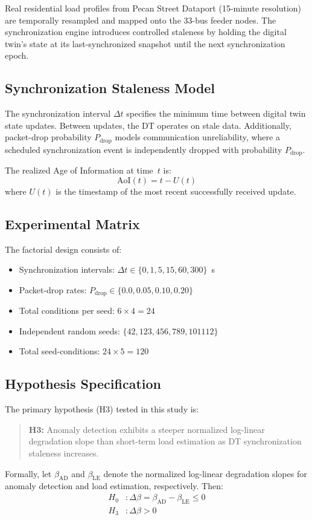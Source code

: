 \documentclass[journal]{IEEEtran}
\newcommand{\dtsync}{\Delta t}
\newcommand{\pdrop}{P_{\mathrm{drop}}}
\newcommand{\aoi}{\mathrm{AoI}}
\newcommand{\dbeta}{\Delta\beta}
\begin{document}
Real residential load profiles from Pecan Street Dataport (15-minute
resolution) are temporally resampled and mapped onto the 33-bus feeder nodes.
The synchronization engine introduces controlled staleness by holding the
digital twin's state at its last-synchronized snapshot until the next
synchronization epoch.

\subsection{Synchronization Staleness Model}
The synchronization interval $\dtsync$ specifies the minimum time between
digital twin state updates. Between updates, the DT operates on stale data.
Additionally, packet-drop probability $\pdrop$ models communication
unreliability, where a scheduled synchronization event is independently
dropped with probability $\pdrop$.

The realized Age of Information at time~$t$ is:
\begin{equation}
    \aoi(t) = t - U(t)
    \label{eq:aoi}
\end{equation}
where $U(t)$ is the timestamp of the most recent successfully received update.

\subsection{Experimental Matrix}
The factorial design consists of:
\begin{itemize}
    \item Synchronization intervals: $\dtsync \in \{0, 1, 5, 15, 60, 300\}$~s
    \item Packet-drop rates: $\pdrop \in \{0.0, 0.05, 0.10, 0.20\}$
    \item Total conditions per seed: $6 \times 4 = 24$
    \item Independent random seeds: $\{42, 123, 456, 789, 101112\}$
    \item Total seed-conditions: $24 \times 5 = 120$
\end{itemize}

\subsection{Hypothesis Specification}
The primary hypothesis (H3) tested in this study is:
\begin{quote}
\textbf{H3:} Anomaly detection exhibits a steeper normalized log-linear
degradation slope than short-term load estimation as DT synchronization
staleness increases.
\end{quote}
Formally, let $\beta_{\mathrm{AD}}$ and $\beta_{\mathrm{LE}}$ denote
the normalized log-linear degradation slopes for anomaly detection and
load estimation, respectively. Then:
\begin{align}
    H_0 &: \dbeta = \beta_{\mathrm{AD}} - \beta_{\mathrm{LE}} \leq 0 \\
    H_3 &: \dbeta > 0
\end{align}
\end{document}
